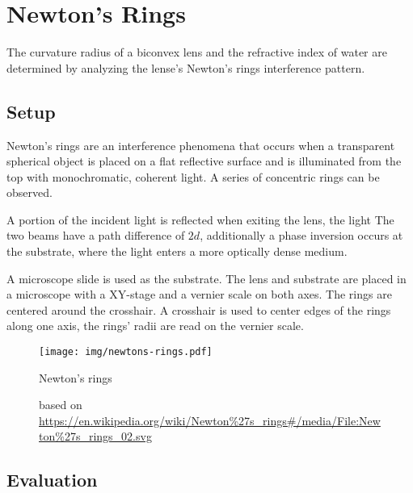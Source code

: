 \chapter{Newton's Rings}

The curvature radius of a biconvex lens and the refractive index of water are determined by analyzing the lense's Newton's rings interference pattern.

\section{Setup}

Newton's rings are an interference phenomena that occurs when a transparent spherical object is placed on a flat reflective surface and is illuminated from the top with monochromatic, coherent light.
A series of concentric rings can be observed.

A portion of the incident light is reflected when exiting the lens, the light 
The two beams have a path difference of $2 d$, additionally a phase inversion occurs at the substrate, where the light enters a more optically dense medium.


A microscope slide is used as the substrate.
The lens and substrate are placed in a microscope with a XY-stage and a vernier scale on both axes.
The rings are centered around the crosshair.
A crosshair is used to center edges of the rings along one axis, the rings' radii are read on the vernier scale.

\begin{figure}
	\centering
	\texttt{[image: img/newtons-rings.pdf]}
	\caption{Newton's rings}
	\caption*{based on \url{https://en.wikipedia.org/wiki/Newton\%27s_rings\#/media/File:Newton\%27s_rings_02.svg}}
\end{figure}

\section{Evaluation}
